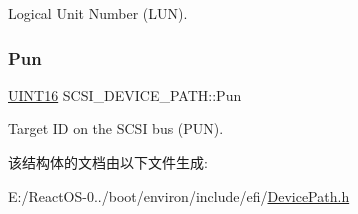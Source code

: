 Logical Unit Number (L\+UN). \mbox{\label{struct_s_c_s_i___d_e_v_i_c_e___p_a_t_h_ab48c334bbbc40d54e023f4acb2e73c08}} 
\subsubsection{\texorpdfstring{Pun}{Pun}}
{\footnotesize\ttfamily \hyperlink{_processor_bind_8h_a09f1a1fb2293e33483cc8d44aefb1eb1}{U\+I\+N\+T16} S\+C\+S\+I\+\_\+\+D\+E\+V\+I\+C\+E\+\_\+\+P\+A\+T\+H\+::\+Pun}

Target ID on the S\+C\+SI bus (P\+UN). 

该结构体的文档由以下文件生成\+:\begin{DoxyCompactItemize}
\item 
E\+:/\+React\+O\+S-\/0../boot/environ/include/efi/\hyperlink{_device_path_8h}{Device\+Path.\+h}\end{DoxyCompactItemize}
